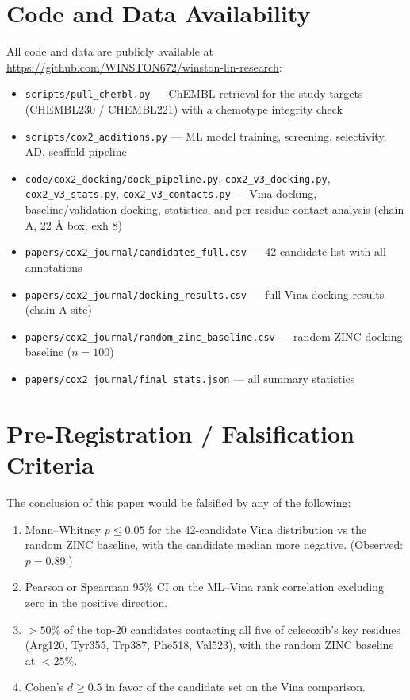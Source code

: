 \documentclass[11pt]{article}
\begin{document}
\section*{Code and Data Availability}

All code and data are publicly available at \url{https://github.com/WINSTON672/winston-lin-research}:
\begin{itemize}
\item \texttt{scripts/pull\_chembl.py} — ChEMBL retrieval for the study targets (CHEMBL230 / CHEMBL221) with a chemotype integrity check
\item \texttt{scripts/cox2\_additions.py} — ML model training, screening, selectivity, AD, scaffold pipeline
\item \texttt{code/cox2\_docking/dock\_pipeline.py}, \texttt{cox2\_v3\_docking.py}, \texttt{cox2\_v3\_stats.py}, \texttt{cox2\_v3\_contacts.py} — Vina docking, baseline/validation docking, statistics, and per-residue contact analysis (chain A, 22 \r{A} box, exh 8)
\item \texttt{papers/cox2\_journal/candidates\_full.csv} — 42-candidate list with all annotations
\item \texttt{papers/cox2\_journal/docking\_results.csv} — full Vina docking results (chain-A site)
\item \texttt{papers/cox2\_journal/random\_zinc\_baseline.csv} — random ZINC docking baseline ($n = 100$)
\item \texttt{papers/cox2\_journal/final\_stats.json} — all summary statistics
\end{itemize}

\section*{Pre-Registration / Falsification Criteria}

The conclusion of this paper would be falsified by any of the following:
\begin{enumerate}
\item Mann--Whitney $p \leq 0.05$ for the 42-candidate Vina distribution vs the random ZINC baseline, with the candidate median more negative. (Observed: $p = 0.89$.)
\item Pearson or Spearman 95\% CI on the ML--Vina rank correlation excluding zero in the positive direction.
\item $> 50\%$ of the top-20 candidates contacting all five of celecoxib's key residues (Arg120, Tyr355, Trp387, Phe518, Val523), with the random ZINC baseline at $< 25\%$.
\item Cohen's $d \geq 0.5$ in favor of the candidate set on the Vina comparison.
\end{enumerate}
\end{document}
